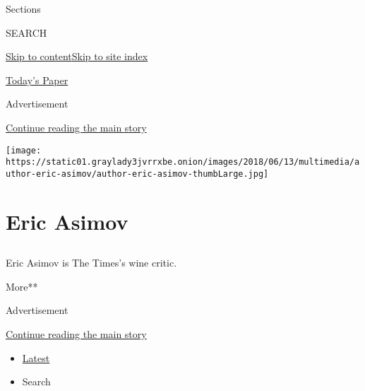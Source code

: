 Sections

SEARCH

\protect\hyperlink{site-content}{Skip to
content}\protect\hyperlink{site-index}{Skip to site index}

\href{https://myaccount.nytimes3xbfgragh.onion/auth/login?response_type=cookie\&client_id=vi}{}

\href{https://www.nytimes3xbfgragh.onion/section/todayspaper}{Today's
Paper}

Advertisement

\protect\hyperlink{after-top}{Continue reading the main story}

\texttt{[image: https://static01.graylady3jvrrxbe.onion/images/2018/06/13/multimedia/author-eric-asimov/author-eric-asimov-thumbLarge.jpg]}

\hypertarget{eric-asimov}{%
\section{Eric Asimov}\label{eric-asimov}}

\subsection{}

Eric Asimov is The Times's wine critic.

More**

Advertisement

\protect\hyperlink{after-mid1}{Continue reading the main story}

\begin{itemize}
\tightlist
\item
  \protect\hyperlink{stream-panel}{Latest}
\item
  Search
\end{itemize}

